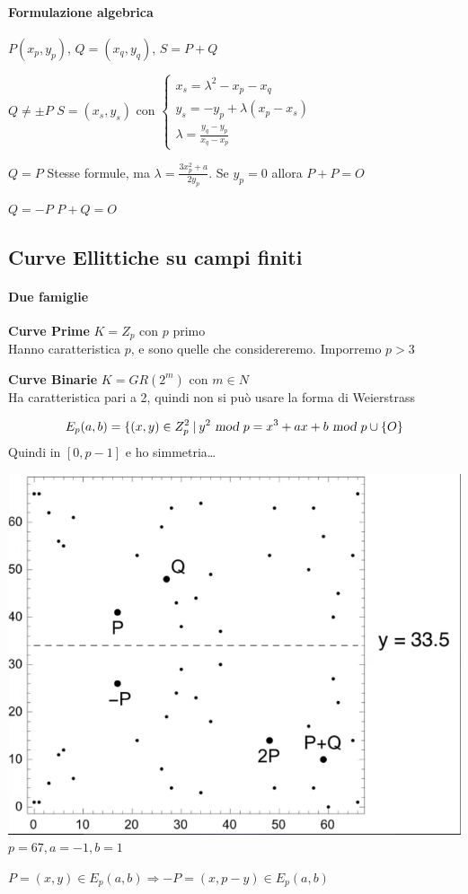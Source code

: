 \documentclass[10pt]{book}
\begin{document}
\paragraph{Formulazione algebrica} $P ( x_p, y_p)$, $Q = (x_q, y_q)$, $S = P + Q$\\
\begin{list}{}{}
	\item[$Q \neq \pm P$] $S = (x_s, y_s)$ con $\left\{\begin{array}{l}
	x_s = \lambda^2 - x_p - x_q\\
	y_s = -y_p + \lambda(x_p - x_s)\\
	\lambda = \frac{y_q - y_p}{x_q - x_p}
	\end{array}\right.$
	\item[$Q = P$] Stesse formule, ma $\lambda = \frac{3x_p^2 + a}{2y_p}$. Se $y_p = 0$ allora $P + P = O$
	\item[$Q = -P$] $P + Q = O$
\end{list}
\subsection{Curve Ellittiche su campi finiti}
\paragraph{Due famiglie}
\begin{list}{}{}
	\item \textbf{Curve Prime} $K = Z_p$ con $p$ primo\\
	Hanno caratteristica $p$, e sono quelle che considereremo. Imporremo $p > 3$
	\item \textbf{Curve Binarie} $K = GR(2^m)$ con $m\in N$\\
	Ha caratteristica pari a 2, quindi non si può usare la forma di Weierstrass
\end{list}
$$E_p(a, b) = \{(x,y)\in Z_p^2\:|\: y^2\textsl{ mod }p = x^3 + ax + b\textsl{ mod }p \cup \{O\}$$
Quindi in $[0, p-1]$ e ho simmetria\ldots %
\begin{center}
	\includegraphics[scale=0.5]{17.png}\\
	$p = 67, a = -1, b = 1$
\end{center}
$P = (x,y) \in E_p(a,b) \Rightarrow -P = (x, p-y) \in E_p(a,b)$
\end{document}
